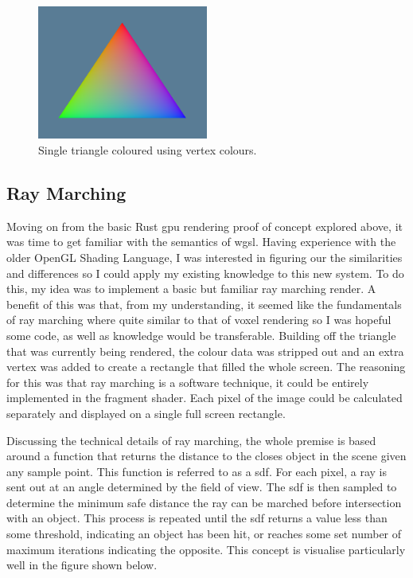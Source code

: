 \documentclass[titlepage]{article}
\begin{document}
\begin{figure}[htp]
    \centering
    \includegraphics[width=0.5\textwidth]{coloured_triangle.png}
    \caption{Single triangle coloured using vertex colours.}
\end{figure}
\FloatBarrier

\subsection{Ray Marching}
Moving on from the basic Rust \acrshort{gpu} rendering proof of concept explored above, it was time to get familiar with the semantics of \acrshort{wgsl}. Having experience with the older OpenGL Shading Language, I was interested in figuring our the similarities and differences so I could apply my existing knowledge to this new system. To do this, my idea was to implement a basic but familiar ray marching render. A benefit of this was that, from my understanding, it seemed like the fundamentals of ray marching where quite similar to that of voxel rendering so I was hopeful some code, as well as knowledge would be transferable. Building off the triangle that was currently being rendered, the colour data was stripped out and an extra vertex was added to create a rectangle that filled the whole screen. The reasoning for this was that ray marching is a software technique, it could be entirely implemented in the fragment shader. Each pixel of the image could be calculated separately and displayed on a single full screen rectangle.

Discussing the technical details of ray marching, the whole premise is based around a function that returns the distance to the closes object in the scene given any sample point. This function is referred to as a \acrfull{sdf}. For each pixel, a ray is sent out at an angle determined by the field of view. The \acrshort{sdf} is then sampled to determine the minimum safe distance the ray can be marched before intersection with an object. This process is repeated until the \acrshort{sdf} returns a value less than some threshold, indicating an object has been hit, or reaches some set number of maximum iterations indicating the opposite. This concept is visualise particularly well in the figure shown below.
\end{document}
